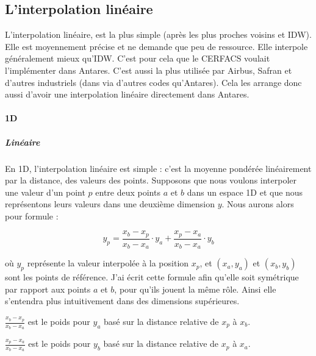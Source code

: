 \subsection{L'interpolation linéaire}
L'interpolation linéaire, est la plus simple (après les plus proches voisins et IDW). Elle est moyennement précise et ne demande que peu de ressource. Elle interpole généralement mieux qu'IDW. C'est pour cela que le CERFACS voulait l'implémenter dans Antares. C'est aussi la plus utilisée par Airbus, Safran et d'autres industriels (dans via d'autres codes qu'Antares). Cela les arrange donc aussi d'avoir une interpolation linéaire directement dans Antares.


\paragraph{1D}
\subparagraph{Linéaire}

En 1D, l'interpolation linéaire est simple : c'est la moyenne pondérée linéairement par la distance, des valeurs des points.
Supposons que nous voulons interpoler une valeur d'un point \( p \) entre deux points \( a \) et \( b \) dans un espace 1D
et que nous représentons leurs valeurs dans une deuxième dimension \( y \).
Nous aurons alors pour formule :

\[
y_p = \frac{x_b - x_p}{x_b - x_a} \cdot y_a + \frac{x_p - x_a}{x_b - x_a} \cdot y_b
\]

où \( y_p \) représente la valeur interpolée à la position \( x_p \), et \((x_a, y_a)\) et \((x_b, y_b)\) sont les points de référence. J'ai écrit cette formule afin qu'elle soit symétrique par rapport aux points \( a \) et \( b \), pour qu'ils jouent la même rôle. Ainsi elle s'entendra plus intuitivement dans des dimensions supérieures.
\vspace{0.5cm}

        \( \frac{x_b - x_p}{x_b - x_a} \) est le poids pour \( y_a \) basé sur la distance relative de \( x_p \) à \( x_b \).

        \( \frac{x_p - x_a}{x_b - x_a} \) est le poids pour \( y_b \) basé sur la distance relative de \( x_p \) à \( x_a \).\vspace{0.5cm}

